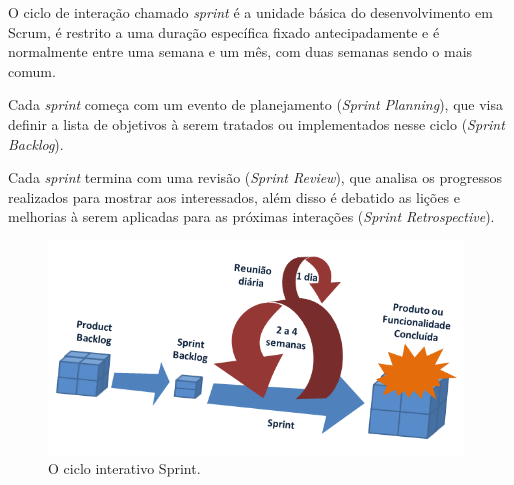 \par O ciclo de interação chamado \emph{sprint} é a unidade básica do desenvolvimento em Scrum, é restrito a uma duração específica fixado antecipadamente e é normalmente entre uma semana e um mês, com duas semanas sendo o mais comum.
\par Cada \emph{sprint} começa com um evento de planejamento (\emph{Sprint Planning}), que visa definir a lista de objetivos à serem tratados ou implementados nesse ciclo (\emph{Sprint Backlog}).
\par Cada \emph{sprint} termina com uma revisão (\emph{Sprint Review}), que analisa os progressos realizados para mostrar aos interessados, além disso é debatido as lições e melhorias à serem aplicadas para as próximas interações (\emph{Sprint Retrospective}).
\begin{figure}[!htb]
\centering
\includegraphics[width=11cm]{figuras/scrum_process}
\caption{\label{fig:scrum_process}O ciclo interativo Sprint.}
\end{figure}

